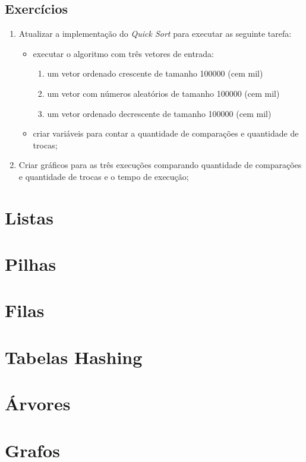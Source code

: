 \documentclass[11pt,fleqn]{book} %
\begin{document}
\subsection*{Exercícios}
\begin{enumerate}
	\item Atualizar a implementação do \textit{Quick Sort} para executar as seguinte tarefa:
	\begin{itemize}
		\item executar o algoritmo com três vetores de entrada:
		\begin{enumerate}
			\item um vetor ordenado crescente de tamanho 100000 (cem mil)
			\item um vetor com números aleatórios de tamanho 100000 (cem mil)
			\item um vetor ordenado decrescente de tamanho 100000 (cem mil)
		\end{enumerate} 
		\item criar variáveis para contar a quantidade de comparações e quantidade de trocas;
	\end{itemize} 
	\item Criar gráficos para as três execuções comparando quantidade de comparações e quantidade de trocas e o tempo de execução;
\end{enumerate} 
\section{Listas}\label{listas}

\section{Pilhas}\label{pilhas}

\section{Filas}\label{filas}

\section{Tabelas Hashing}\label{hashing}

\section{Árvores}\label{arvores}

\section{Grafos}\label{grafos}
\end{document}

